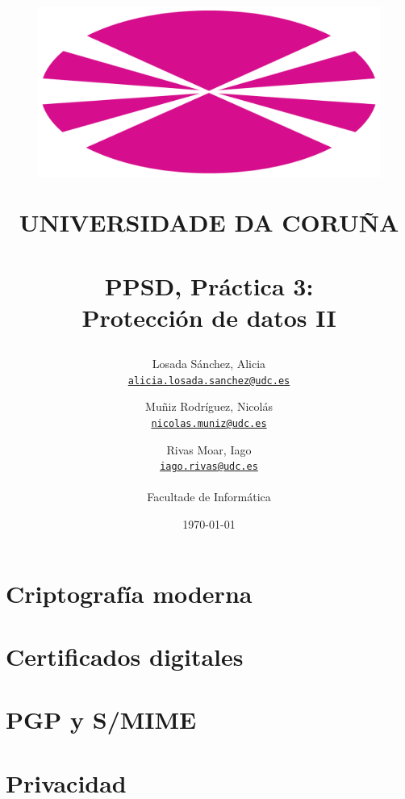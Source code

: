 \documentclass[12pt,a4paper]{article}
\title{
    \begin{figure}[htbp!]
        \begin{center}
        \includegraphics[scale=0.4]{ejercicios/img/UDC.png}       %
        \end{center}
        \label{fig:udc}
    \end{figure}

    \textsf{UNIVERSIDADE DA CORUÑA \\}
    \textbf{\\ PPSD, Práctica 3: \\ Protección de datos II}
}
\author{
    Losada Sánchez, Alicia\\
    \texttt{\href{mailto:alicia.losada.sanchez@udc.es}{alicia.losada.sanchez@udc.es}}
    \and
    Muñiz Rodríguez, Nicolás\\
    \texttt{\href{mailto:nicolas.muniz@udc.es}{nicolas.muniz@udc.es}}
    \and
    Rivas Moar, Iago\\
    \texttt{\href{mailto:iago.rivas@udc.es}{iago.rivas@udc.es}}
    \\ \\
    Facultade de Informática
}
\date{\today}
\begin{document}
\maketitle

\thispagestyle{empty}

\newpage
{}

\section{Criptografía moderna}





\section{Certificados digitales}



\section{PGP y S/MIME}







\section{Privacidad}






\end{document}
